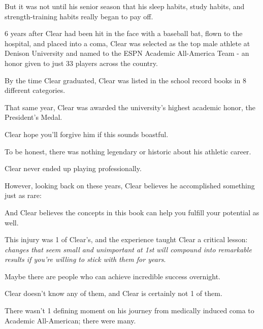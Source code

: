 \documentclass[oneside]{article}
\numberwithin{equation}{section}
\begin{document}
But it was not until his senior season that his sleep habits, study habits, and strength-training habits really began to pay off.

%
6 years after Clear had been hit in the face with a baseball bat, flown to the hospital, and placed into a coma, Clear was selected as the top male athlete at Denison University and named to the ESPN Academic All-America Team - an honor given to just 33 players across the country.

By the time Clear graduated, Clear was listed in the school record books in 8 different categories.

That same year, Clear was awarded the university's highest academic honor, the President's Medal.

%
Clear hope you'll forgive him if this sounds boastful.

To be honest, there was nothing legendary or historic about his athletic career.

Clear never ended up playing professionally.

However, looking back on these years, Clear believes he accomplished something just as rare: 

And Clear believes the concepts in this book can help you fulfill your potential as well.

%

This injury was 1 of Clear's, and the experience taught Clear a critical lesson: \textit{changes that seem small and unimportant at 1st will compound into remarkable results if you're willing to stick with them for years}.




%
Maybe there are people who can achieve incredible success overnight.

Clear doesn't know any of them, and Clear is certainly not 1 of them.

There wasn't 1 defining moment on his journey from medically induced coma to Academic All-American; there were many.

\end{document}
